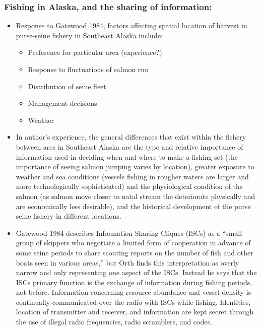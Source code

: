 \documentclass[a4paper,10pt]{article}
\begin{document}
\subsubsection*{Fishing in Alaska, and the sharing of information: \cite{orth1987fishing}}
\begin{itemize}
\item Response to {\color{Grey}Gatewood 1984}, factors affecting spatial location of harvest in purse-seine fishery in Southeast Alaska include:
	\begin{itemize}
	\item Preference for particular area (experience?)
	\item Response to fluctuations of salmon run
	\item Distribution of seine fleet
	\item Management decisions
	\item Weather
	\end{itemize}

\item In author's experience, the general differences that exist within the fishery between ares in Southeast Alaska are the type and relative importance of information used in deciding when and where to make a fishing set (the importance of seeing salmon jumping varies by location), greater exposure to weather and sea conditions (vessels fishing in rougher waters are larger and more technologically sophisticated) and the physiological condition of the salmon (as salmon move closer to natal stream the deteriorate physically and are economically less desirable), and the historical development of the purse seine fishery in different locations.  

\item {\color{Grey}Gatewood 1984} describes Information-Sharing Cliques (ISCs) as a ``small group of skippers who negotiate a limited form of cooperation in advance of some seine periods to share scouting reports on the number of fish and other boats seen in various areas,'' but Orth finds this interpretation as overly narrow and only representing one aspect of the ISCs. Instead he says that the ISCs primary function is the exchange of information during fishing periods, not before. Information concerning resource abundance and vessel density is continually communicated over the radio with ISCs while fishing. Identities, location of transmitter and receiver, and information are kept secret through the use of illegal radio frequencies, radio scramblers, and codes. 


\end{itemize}
\end{document}
